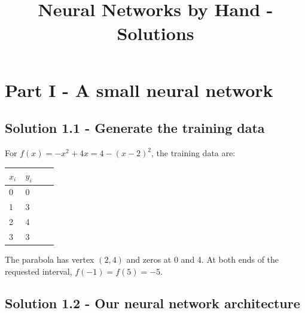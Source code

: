 \documentclass{course_sheet}
\title{\\Neural Networks by Hand - Solutions}
\author{}
\date{}
\begin{document}
\maketitle

\section{Part I - A small neural network}

\subsection{Solution 1.1 - Generate the training data}

For $f(x)=-x^2+4x=4-(x-2)^2$, the training data are:

\begin{center}

\begingroup
\setlength{\tabcolsep}{3pt}
\begin{tabular}{@{}p{0.328\linewidth}p{0.638\linewidth}@{}}
\toprule
$x_i$ & $y_i$ \\
\midrule
0 & 0 \\
1 & 3 \\
2 & 4 \\
3 & 3 \\
\bottomrule
\end{tabular}
\endgroup

\end{center}

The parabola has vertex $(2,4)$ and zeros at 0 and 4. At both ends of
the requested interval, $f(-1)=f(5)=-5$.

\begin{center}


\end{center}

\subsection{Solution 1.2 - Our neural network architecture}
\end{document}
